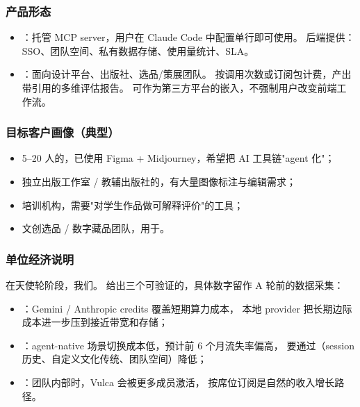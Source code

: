 \subsubsection*{产品形态}
\begin{itemize}
  \item {}：托管 MCP server，用户在 Claude Code 中配置单行即可使用。
  后端提供：SSO、团队空间、私有数据存储、使用量统计、SLA。
  \item {}：面向设计平台、出版社、选品/策展团队。
  按调用次数或订阅包计费，产出带引用的多维评估报告。
  可作为第三方平台的嵌入，不强制用户改变前端工作流。
\end{itemize}

\subsubsection*{目标客户画像（典型）}

\begin{itemize}
  \item 5–20 人的，已使用 Figma + Midjourney，希望把 AI 工具链"agent 化"；
  \item 独立出版工作室 / 教辅出版社的，有大量图像标注与编辑需求；
  \item {}培训机构，需要"对学生作品做可解释评价"的工具；
  \item 文创选品 / 数字藏品团队，用于。
\end{itemize}

\subsubsection*{单位经济说明}

在天使轮阶段，我们。
给出三个可验证的，具体数字留作 A 轮前的数据采集：

\begin{itemize}
  \item {}：Gemini / Anthropic credits 覆盖短期算力成本，
  本地 provider 把长期边际成本进一步压到接近带宽和存储；
  \item {}：agent-native 场景切换成本低，预计前 6 个月流失率偏高，
  要通过（session 历史、自定义文化传统、团队空间）降低；
  \item {}：团队内部时，Vulca 会被更多成员激活，
  按席位订阅是自然的收入增长路径。
\end{itemize}

